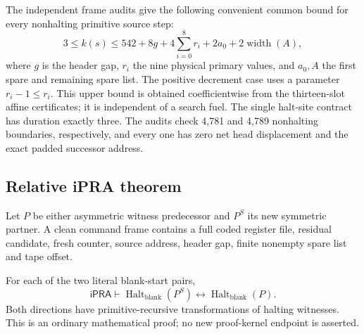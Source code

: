The independent frame audits give the following convenient common bound
for every nonhalting primitive source step:
\[
 3\le k(s)\le
 542+8g+4\sum_{i=0}^{8}r_i+2a_0+2\operatorname{width}(A),
\]
where $g$ is the header gap, $r_i$ the nine physical primary values,
and $a_0,A$ the first spare and remaining spare list.  The positive
decrement case uses a parameter $r_i-1\le r_i$.  This upper bound is
obtained coefficientwise from the thirteen-slot affine certificates;
it is independent of a search fuel.  The single halt-site contract has
duration exactly three.  The audits check 4,781 and 4,789 nonhalting
boundaries, respectively, and every one has zero net head displacement
and the exact padded successor address.

\subsection{Relative iPRA theorem}

Let $P$ be either asymmetric witness predecessor and $P^S$ its new
symmetric partner.  A clean command frame contains a full coded
register file, residual candidate, fresh counter, source address,
header gap, finite nonempty spare list and tape offset.

\begin{theorem}
For each of the two literal blank-start pairs,
\[
 \mathsf{iPRA}\vdash
    \operatorname{Halt}_{\mathrm{blank}}(P^S)
       \longleftrightarrow
    \operatorname{Halt}_{\mathrm{blank}}(P).
\]
Both directions have primitive-recursive transformations of halting
witnesses.  This is an ordinary mathematical proof; no new proof-kernel
endpoint is asserted.
\end{theorem}

